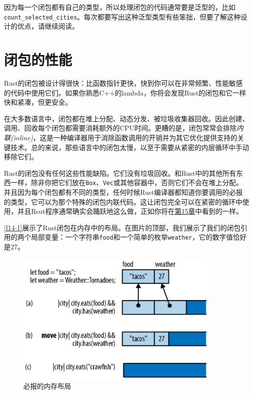 因为每一个闭包都有自己的类型，所以处理闭包的代码通常要是泛型的，比如\texttt{count\_selected\_cities}。每次都要写出这种泛型类型有些笨拙，但要了解这种设计的优点，请继续阅读。

\section{闭包的性能}

Rust的闭包被设计得很快：比函数指针更快，快到你可以在非常频繁、性能敏感的代码中使用它们。如果你熟悉C++的lambda，你将会发现Rust的闭包和它一样快和紧凑，但更安全。

在大多数语言中，闭包都在堆上分配、动态分发、被垃圾收集器回收。因此创建、调用、回收每个闭包都需要消耗额外的CPU时间。更糟的是，闭包常常会排除\emph{内联(inline)}，这是一种编译器用于消除函数调用的开销并为其它优化提供支持的关键技术。总的来说，那些语言中的闭包太慢，以至于需要从紧密的内层循环中手动移除它们。

Rust的闭包没有任何这些性能缺陷。它们没有垃圾回收。和Rust中的其他所有东西一样，除非你把它们放在\texttt{Box}、\texttt{Vec}或其他容器中，否则它们不会在堆上分配。并且因为每个闭包都有不同的类型，任何时候Rust编译器都知道你要调用的必报的类型，它可以为那个特殊的闭包内联代码。这让闭包完全可以在紧密的循环中使用，并且Rsut程序通常确实会踊跃地这么做，正如你将在\hyperref[ch15]{第15章}中看到的一样。

\autoref{f14-1}展示了Rust闭包在内存中的布局。在图片的顶部，我们展示了我们的闭包引用的两个局部变量：一个字符串\texttt{food}和一个简单的枚举\texttt{weather}，它的数字值恰好是27。

\begin{figure}[htbp]
    \centering
    \includegraphics[width=0.9\textwidth]{../img/f14-1.png}
    \caption{必报的内存布局}
    \label{f14-1}
\end{figure}

